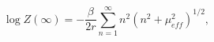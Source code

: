 \begin{equation}
\log Z\left(\infty \right)=-\frac{\beta }{2r}\sum _{n=1}^{\infty }n^{2}\left(n^{2}+\mu _{eff}^{2}\right)^{1/2},\end{equation}

